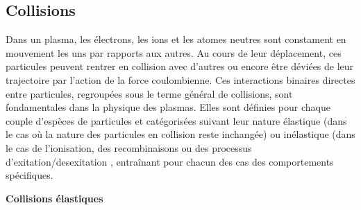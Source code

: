 \subsection{Collisions}
Dans un plasma, les électrons, les ions et les atomes neutres sont constament en
mouvement les uns par rapports aux autres.
Au cours de leur déplacement, ces particules peuvent rentrer en collision avec d'autres
ou encore être déviées de leur trajectoire par l'action de la force
coulombienne. Ces interactions binaires directes entre particules, regroupées
sous le terme général de collisions, sont fondamentales dans la physique des plasmas.
Elles sont définies pour chaque couple d'espèces de particules et catégorisées suivant
leur nature élastique (dans le cas où la nature des particules en collision
reste inchangée) ou inélastique (dans le cas de l'ionisation, des
recombinaisons ou des processus d'exitation/desexitation , entraînant pour
chacun des cas des comportements spécifiques.




\textbf{Collisions élastiques}

